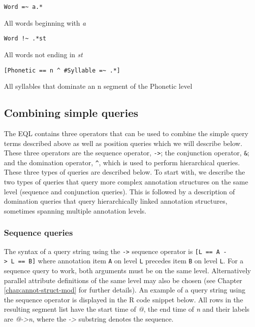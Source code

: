 \documentclass[
]{book}
\begin{document}
\texttt{Word\ =\textasciitilde{}\ a.*}

All words beginning with \emph{a}

\texttt{Word\ !\textasciitilde{}\ .*st}

All words not ending in \emph{st}

\texttt{{[}Phonetic\ ==\ n\ \^{}\ \#Syllable\ =\textasciitilde{}\ .*{]}}

All syllables that dominate an n segment of the Phonetic level

\hypertarget{combining-simple-queries}{%
\subsection{Combining simple queries}\label{combining-simple-queries}}

The EQL contains three operators that can be used to combine the simple query terms described above as well as position queries which we will describe below. These three operators are the sequence operator, \texttt{-\textgreater{}}; the conjunction operator, \texttt{\&}; and the domination operator, \texttt{\^{}}, which is used to perform hierarchical queries. These three types of queries are described below. To start with, we describe the two types of queries that query more complex annotation structures on the same level (sequence and conjunction queries). This is followed by a description of domination queries that query hierarchically linked annotation structures, sometimes spanning multiple annotation levels.

\hypertarget{sequence-queries}{%
\subsubsection{Sequence queries}\label{sequence-queries}}

The syntax of a query string using the \texttt{-\textgreater{}} sequence operator is \texttt{{[}L\ ==\ A\ -\textgreater{}\ L\ ==\ B{]}} where annotation item \texttt{A} on level \texttt{L} precedes item \texttt{B} on level \texttt{L}. For a sequence query to work, both arguments must be on the same level. Alternatively parallel attribute definitions of the same level may also be chosen (see Chapter \ref{chap:annot-struct-mod} for further details). An example of a query string using the sequence operator is displayed in the R code snippet below. All rows in the resulting segment list have the start time of \emph{@}, the end time of \emph{n} and their labels are \emph{@-\textgreater n}, where the \emph{-\textgreater{}} substring denotes the sequence.
\end{document}
